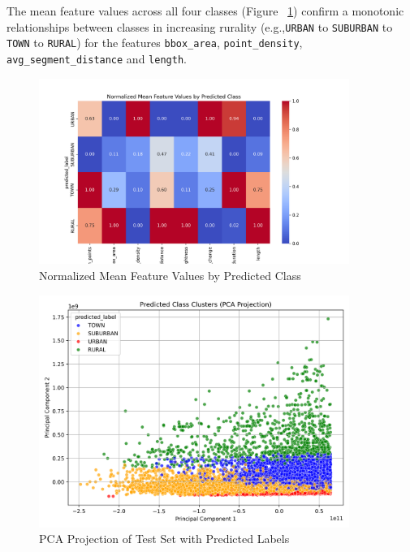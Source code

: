 \documentclass[a4paper,12pt,twoside]{scrreprt}
\begin{document}
The mean feature values across all four classes (Figure
~\ref{fig:mean_feature_value_matrix_by_class}) confirm a monotonic
relationships
between classes in increasing rurality (e.g.,\texttt{URBAN} to
\texttt{SUBURBAN} to \texttt{TOWN} to
\texttt{RURAL})
for the features
\texttt{bbox\_area}, \texttt{point\_density}, \texttt{avg\_segment\_distance}
and \texttt{length}.

\begin{figure}[htbp]
  \centering

  \includegraphics[width=0.9\textwidth]{Figures/classifier/feature_values_normalized.png}
  \caption{Normalized Mean Feature Values by Predicted Class}
  \label{fig:mean_feature_value_matrix_by_class}
\end{figure}
\FloatBarrier

\begin{figure}[htbp]
  \centering

  \includegraphics[width=0.9\textwidth]{Figures/classifier/pca_projection_test_set.png}
  \caption{PCA Projection of Test Set with Predicted Labels}
  \label{fig:pca_projection_test_set}
\end{figure}
\FloatBarrier
\end{document}

